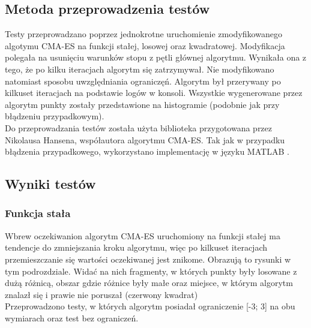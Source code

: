 \documentclass{mini}
\begin{document}
\subsection{Metoda przeprowadzenia testów}
Testy przeprowadzano poprzez jednokrotne uruchomienie zmodyfikowanego algotymu CMA-ES na funkcji stałej, losowej oraz kwadratowej. Modyfikacja polegała na usunięciu warunków stopu z pętli głównej algorytmu. Wynikała ona z tego, że po kilku iteracjach algorytm się zatrzymywał. Nie modyfikowano natomiast sposobu uwzględniania ograniczęń. Algorytm był przerywany po kilkuset iteracjach na podstawie logów w konsoli. Wszystkie wygenerowane przez algorytm punkty zostały przedstawione na histogramie (podobnie jak przy błądzeniu przypadkowym).\\
Do przeprowadzania testów została użyta biblioteka przygotowana przez Nikolausa Hansena, współautora algorytmu CMA-ES. Tak jak w przypadku błądzenia przypadkowego, wykorzystano implementację w języku MATLAB \cite{cmaes_code}.

\subsection{Wyniki testów}

\subsubsection*{Funkcja stała}
Wbrew oczekiwanion algorytm CMA-ES uruchomiony na funkcji stałej ma tendencje do zmniejszania kroku algorytmu, więc po kilkuset iteracjach przemieszczanie się wartości oczekiwanej jest znikome. Obrazują to rysunki w tym podrozdziale. Widać na nich fragmenty, w których punkty były losowane z dużą różnicą, obszar gdzie różnice były małe oraz miejsce, w którym algorytm znalazł się i prawie nie poruszał (czerwony kwadrat)\\
Przeprowadzono testy, w których algorytm posiadał ograniczenie [-3; 3] na obu wymiarach oraz test bez ograniczeń.
\end{document}
